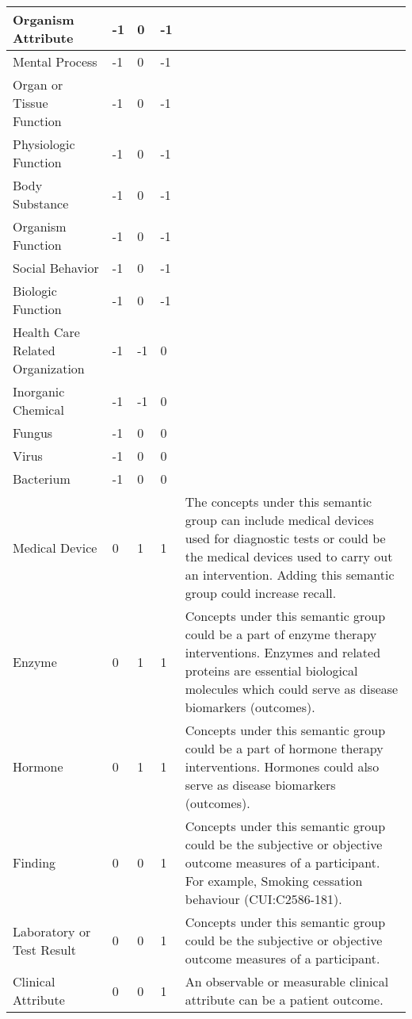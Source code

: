 \documentclass[10.7pt,]{article}
\begin{document}
\begin{longtable}{|l|p{0.3cm}|p{0.3cm}|p{0.3cm}|p{7.9cm}|}
        Organism Attribute & -1 & 0 & -1 & ~ \\ \hline
        Mental Process & -1 & 0 & -1 & ~ \\ \hline
        Organ or Tissue Function & -1 & 0 & -1 & ~ \\ \hline
        Physiologic Function & -1 & 0 & -1 & ~ \\ \hline
        Body Substance & -1 & 0 & -1 & ~ \\ \hline
        Organism Function & -1 & 0 & -1 & ~ \\ \hline
        Social Behavior & -1 & 0 & -1 & ~ \\ \hline
        Biologic Function & -1 & 0 & -1 & ~ \\ \hline
        Health Care Related Organization & -1 & -1 & 0 & ~ \\ \hline
        Inorganic Chemical & -1 & -1 & 0 & ~ \\ \hline
        Fungus & -1 & 0 & 0 & ~ \\ \hline
        Virus & -1 & 0 & 0 & ~ \\ \hline
        Bacterium & -1 & 0 & 0 & ~ \\ \hline
        Medical Device & 0 & 1 & 1 & The concepts under this semantic group can include medical devices used for diagnostic tests or could be the medical devices used to carry out an intervention. Adding this semantic group could increase recall. \\ \hline
        Enzyme & 0 & 1 & 1 & Concepts under this semantic group could be a part of enzyme therapy interventions. Enzymes and related proteins are essential biological molecules which could serve as disease biomarkers (outcomes). \\ \hline
        Hormone & 0 & 1 & 1 & Concepts under this semantic group could be a part of hormone therapy interventions. Hormones could also serve as disease biomarkers (outcomes). \\ \hline
        Finding & 0 & 0 & 1 & Concepts under this semantic group could be the subjective or objective outcome measures of a participant. For example, Smoking cessation behaviour (CUI:C2586-181). \\ \hline
        Laboratory or Test Result & 0 & 0 & 1 & Concepts under this semantic group could be the subjective or objective outcome measures of a participant. \\ \hline
        Clinical Attribute & 0 & 0 & 1 & An observable or measurable clinical attribute can be a patient outcome. \\ \hline

\end{longtable}
\end{document}
